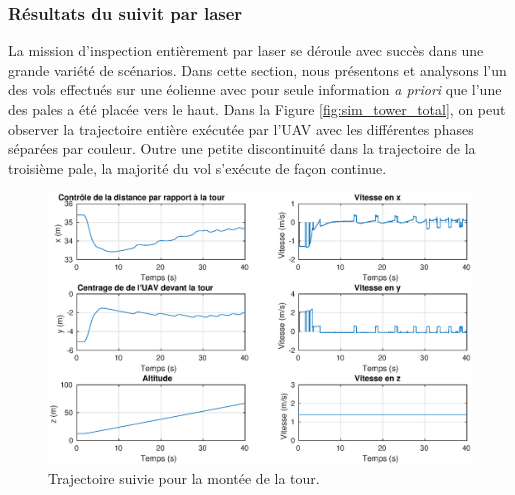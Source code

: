 \subsubsection{Résultats du suivit par laser}

La mission d'inspection entièrement par laser se déroule avec succès dans une grande variété de scénarios. Dans cette section, nous présentons et analysons l'un des vols effectués sur une éolienne avec pour seule information \textit{a priori} que l'une des pales a été placée vers le haut. Dans la Figure \ref{fig:sim_tower_total}, on peut observer la trajectoire entière exécutée par l'UAV avec les différentes phases séparées par couleur. Outre une petite discontinuité dans la trajectoire de la troisième pale, la majorité du vol s'exécute de façon continue.
\begin{figure}[!htb]
  \centering
  \includegraphics[width=\linewidth]{images/sim_tower_ascent}
  \caption{Trajectoire suivie pour la montée de la tour.}
  \label{fig:sim_tower_ascent}
\end{figure}

